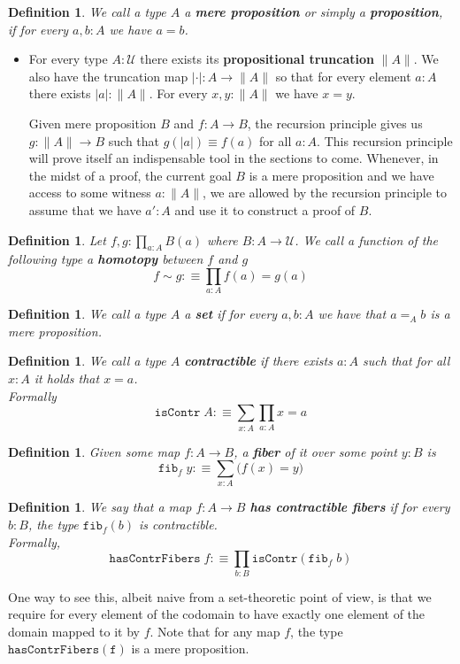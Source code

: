 \documentclass[12pt]{report}
\newtheorem{defn}[thm]{Definition}
\begin{document}
	\begin{defn}
	We call a type $A$ a \textbf{mere proposition} or simply a \textbf{proposition}, if for every $a,b : A$ we have $a = b$.
	\end{defn}
\begin{itemize}
	\item For every type $A : \mathcal{U}$ there exists its \textbf{propositional truncation} $\| A \|$. 
	We also have the truncation map $|\cdot| : A \rightarrow \lVert A \rVert$ so that for every element $a : A$ there exists $|a| : \| A\|$. 
	For every $x, y : \| A\|$ we have $x = y$. 

	Given mere proposition $B$ and $f : A \rightarrow B$, the recursion principle gives us $g : \|A\| \rightarrow B$ such that $g(|a|) \equiv f(a)$ for all $a : A$.
	This recursion principle will prove itself an indispensable tool in the sections to come. 
	Whenever, in the midst of a proof, the current goal $B$ is a mere proposition and we have access to some witness $a : \lVert A \rVert$, we are allowed by the recursion principle to assume that we have $a' : A$ and use it to construct a proof of $B$.
\end{itemize}
	\begin{defn}
	Let $f,g : \prod_{a:A}B(a)$ where $B :A \rightarrow \mathcal{U}$. 
	We call a function of the following type a \textbf{homotopy} between $f$ and $g$
	$$f\sim g :\equiv \prod_{a:A}f(a) = g(a)$$
	\end{defn}

	\begin{defn}
	We call a type $A$ a \textbf{set} if for every $a,b : A$ we have that $a =_A b$ is a mere proposition.
	\end{defn}

	\begin{defn}
	We call a type $A$ \textbf{contractible} if there exists $a : A$ such that for all $x : A$ it holds that $x = a$.\\
	Formally
	$$\mathtt{isContr}\; A :\equiv \sum_{x : A}\prod_{a :A}x=a$$
	\end{defn}

	\begin{defn}
	Given some map $f : A \rightarrow B$, a \textbf{fiber} of it over some point $y : B$ is
	$$\mathtt{fib}_f\; y :\equiv \sum_{x : A} \big(f(x) = y\big)$$
	\end{defn}

	\begin{defn}
	We say that a map $f : A\rightarrow B$ \textbf{has contractible fibers} if for every $b : B$, the type $\mathtt{fib}_f(b)$ is contractible.\\
	Formally, 
	$$ \mathtt{hasContrFibers}\; f : \equiv \prod_{b : B} \mathtt{isContr}(\mathtt{fib}_f\; b)$$
 	\end{defn}
 	One way to see this, albeit naive from a set-theoretic point of view, is that we require for every element of the codomain to have exactly one element of the domain mapped to it by $f$. 
 	Note that for any map $f$, the type $\mathtt{hasContrFibers(f)}$ is a mere proposition. 
\end{document}
